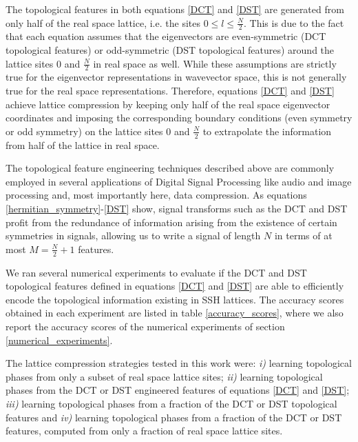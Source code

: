 \documentclass[10pt]{revtex4-1}
\begin{document}
The topological features in both equations \eqref{DCT} and \eqref{DST} are generated from only half of the real space lattice, i.e. the sites $0 \leq l \leq \frac{N}{2}$. This is due to the fact that each equation assumes that the eigenvectors are even-symmetric (DCT topological features) or odd-symmetric (DST topological features) around the lattice sites $0$ and $\frac{N}{2}$ in real space as well. While these assumptions are strictly true for the eigenvector representations in wavevector space, this is not generally true for the real space representations. Therefore, equations \eqref{DCT} and \eqref{DST} achieve lattice compression by keeping only half of the real space eigenvector coordinates and imposing the corresponding boundary conditions (even symmetry or odd symmetry) on the lattice sites $0$ and $\frac{N}{2}$ to extrapolate the information from half of the lattice in real space. 

The topological feature engineering techniques described above are commonly employed in several applications of Digital Signal Processing like audio and image processing and, most importantly here, data compression. As equations \eqref{hermitian_symmetry}-\eqref{DST} show, signal transforms such as the DCT and DST profit from the redundance of information arising from the existence of certain symmetries in signals, allowing us to write a signal of length $N$ in terms of at most $M = \frac{N}{2}+1$ features. 
   
We ran several numerical experiments to evaluate if the DCT and DST topological features defined in equations \eqref{DCT} and \eqref{DST}  are able to efficiently encode the topological information existing in SSH lattices. The accuracy scores obtained in each experiment are listed in table \ref{accuracy_scores}, where we also report the accuracy scores of the numerical experiments of section \ref{numerical_experiments}.

The lattice compression strategies tested in this work were: \emph{i)} learning topological phases from only a subset of real space lattice sites; \emph{ii)} learning topological phases from the DCT or DST engineered features of equations \eqref{DCT} and \eqref{DST}; \emph{iii)} learning topological phases from a fraction of the DCT or DST topological features and \emph{iv)} learning topological phases from a fraction of the DCT or DST features, computed from only a fraction of real space lattice sites. 
\end{document}
